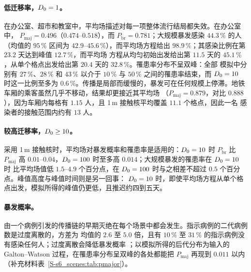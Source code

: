 \paragraph{低迁移率，$D_0=1$。}在办公室、超市和教室中，平均场描述对每一项整体流行结局都失效。在办公室中，
$P_{\mathrm{maj}}=0.496$（$0.474$--$0.518$），而 $P_{\mathrm{br}}=0.781$；大规模暴发感染 $44.3\,\%$ 的人（均值的
$95\,\%$ 区间为 $42.9$--$45.6\,\%$），而平均场方程给出 $98.9\,\%$；其感染比例在第 $23.2$ 天达到峰值 $12.7\,\%$，而平均场
方程从均匀初始出发给出第 $11.5$ 天的 $45.1\,\%$，从单个格点出发给出第 $20.4$ 天的 $32.8\,\%$。罹患率分布不呈双峰：全部
模拟中分别有 $27\,\%$、$28\,\%$ 和 $43\,\%$ 以介于 $10\,\%$ 与 $50\,\%$ 之间的罹患率结束，而 $D_0=10$ 时这一比例至多为
$0.6\,\%$。传播是局部而缓慢的，暴发可在任何规模上停滞。地铁车厢的乘客虽然几乎不移动，结果却更接近其平均场
（$P_{\mathrm{maj}}=0.879$，对比 $0.888$），因为车厢内每格有 $1.15$ 人，且 1\,m 接触核平均覆盖 $11.1$ 个格点，因此一名
感染者的接触范围内约有 $13$ 人。

\paragraph{较高迁移率，$D_0\ge10$。}采用 1\,m 接触核时，平均场对暴发概率和罹患率是适用的：$D_0=10$ 时
$P_{\mathrm{br}}$ 比 $P_{\mathrm{maj}}$ 高 $0.01$--$0.04$，$D_0=100$ 时至多高 $0.014$；大规模暴发的罹患率在 $D_0=10$ 时
比平均场值低 $1.5$--$4.9$ 个百分点，在 $D_0=100$ 时与之相差不超过 $0.5$ 个百分点。峰值高度与峰值时间则是另一回事：
$D_0=10$ 时，即使平均场方程从单个格点出发，模拟所得的峰值仍更低，且推迟约四到五天。

\paragraph{暴发概率。}由一个病例引发的传播链的早期灭绝在每个场景中都会发生。指示病例的二代病例数是过度离散的，方差为
均值的 $2.6$ 至 $5.0$ 倍，且有 $10\,\%$ 至 $31\,\%$ 的指示病例没有感染任何人；过度离散会降低暴发概率
\citep{lloydsmith2005superspreading}；以模拟所得的后代分布为输入的 Galton--Watson 过程，在罹患率分布呈双峰的各处都能把
$P_{\mathrm{maj}}$ 再现到 $0.011$ 以内（补充材料表~\ref{S-s6_scenes:tab:pmajor}）。

